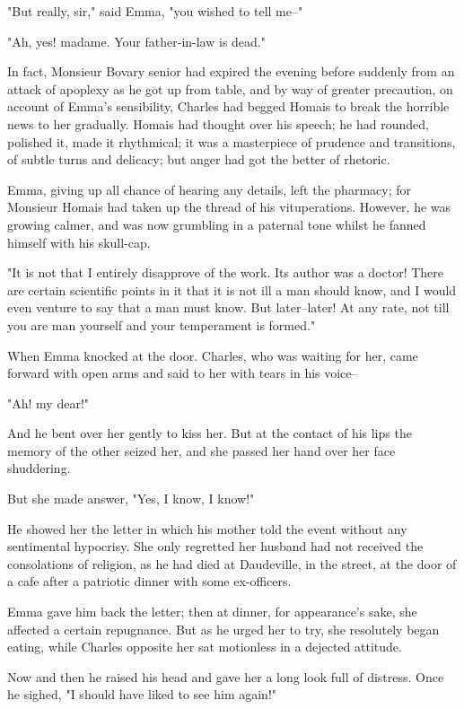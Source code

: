 \documentclass{tufte-book}
\begin{document}
"But really, sir," said Emma, "you wished to tell me--"

"Ah, yes! madame. Your father-in-law is dead."

In fact, Monsieur Bovary senior had expired the evening before suddenly
from an attack of apoplexy as he got up from table, and by way of
greater precaution, on account of Emma's sensibility, Charles had begged
Homais to break the horrible news to her gradually. Homais had thought
over his speech; he had rounded, polished it, made it rhythmical; it was
a masterpiece of prudence and transitions, of subtle turns and delicacy;
but anger had got the better of rhetoric.

Emma, giving up all chance of hearing any details, left the pharmacy;
for Monsieur Homais had taken up the thread of his vituperations.
However, he was growing calmer, and was now grumbling in a paternal tone
whilst he fanned himself with his skull-cap.

"It is not that I entirely disapprove of the work. Its author was a
doctor! There are certain scientific points in it that it is not ill a
man should know, and I would even venture to say that a man must know.
But later--later! At any rate, not till you are man yourself and your
temperament is formed."

When Emma knocked at the door. Charles, who was waiting for her, came
forward with open arms and said to her with tears in his voice--

"Ah! my dear!"

And he bent over her gently to kiss her. But at the contact of his lips
the memory of the other seized her, and she passed her hand over her
face shuddering.

But she made answer, "Yes, I know, I know!"

He showed her the letter in which his mother told the event without any
sentimental hypocrisy. She only regretted her husband had not received
the consolations of religion, as he had died at Daudeville, in the
street, at the door of a cafe after a patriotic dinner with some
ex-officers.

Emma gave him back the letter; then at dinner, for appearance's sake,
she affected a certain repugnance. But as he urged her to try, she
resolutely began eating, while Charles opposite her sat motionless in a
dejected attitude.

Now and then he raised his head and gave her a long look full of
distress. Once he sighed, "I should have liked to see him again!"
\end{document}
